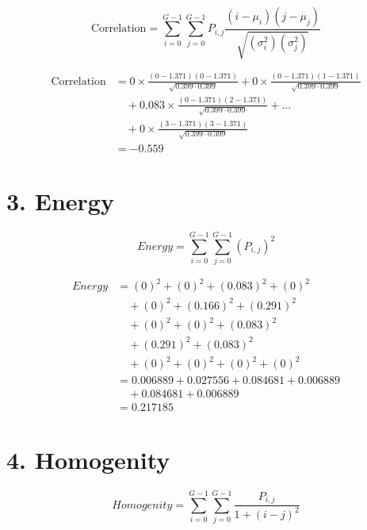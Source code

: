 \[
\text{Correlation} = \sum_{i=0}^{G-1} \sum_{j=0}^{G-1} P_{i,j} \frac{(i - \mu_i)(j - \mu_j)}{\sqrt{(\sigma_i^2)(\sigma_j^2)}}
\]

\begin{align*}
\text{Correlation} &= 0 \times \frac{(0 - 1.371)(0 - 1.371)}{\sqrt{0.399 \cdot 0.399}} + 0 \times \frac{(0 - 1.371)(1 - 1.371)}{\sqrt{0.399 \cdot 0.399}} \\
&\quad + 0.083 \times \frac{(0 - 1.371)(2 - 1.371)}{\sqrt{0.399 \cdot 0.399}} + \ldots \\
&\quad + 0 \times \frac{(3 - 1.371)(3 - 1.371)}{\sqrt{0.399 \cdot 0.399}} \\
&= -0.559
\end{align*}

\section*{3. Energy}

\[
Energy = \sum_{i=0}^{G-1} \sum_{j=0}^{G-1} (P_{i,j})^2
\]

\begin{align*}
Energy &= (0)^2 + (0)^2 + (0.083)^2 + (0)^2 \\
&\quad + (0)^2 + (0.166)^2 + (0.291)^2 \\
&\quad + (0)^2 + (0)^2 + (0.083)^2 \\
&\quad + (0.291)^2 + (0.083)^2 \\
&\quad + (0)^2 + (0)^2 + (0)^2 + (0)^2 \\
&= 0.006889 + 0.027556 + 0.084681 + 0.006889 \\
&\quad + 0.084681 + 0.006889 \\
&= 0.217185
\end{align*}


\section*{4. Homogenity}

\[
Homogenity = \sum_{i=0}^{G-1} \sum_{j=0}^{G-1} \frac{P_{i,j}}{1 + (i - j)^2}
\]

